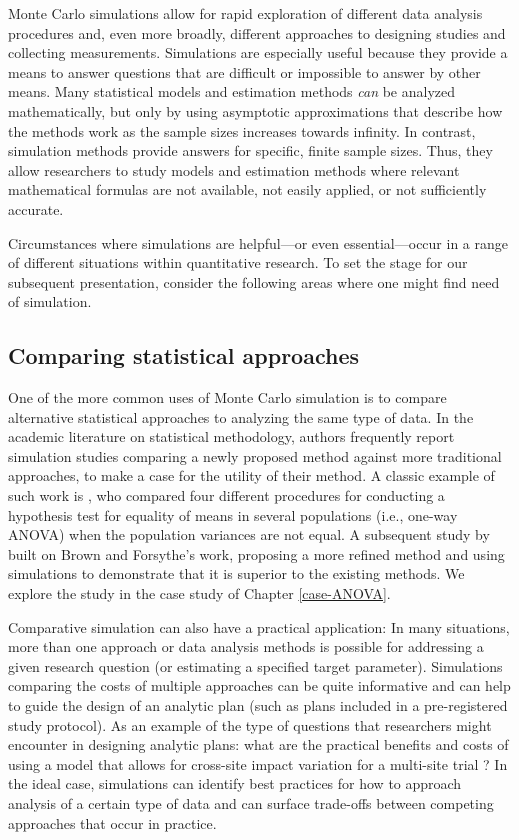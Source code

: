 \documentclass[
]{book}
\begin{document}
Monte Carlo simulations allow for rapid exploration of different data analysis procedures and, even more broadly, different approaches to designing studies and collecting measurements. Simulations are especially useful because they provide a means to answer questions that are difficult or impossible to answer by other means.
Many statistical models and estimation methods \emph{can} be analyzed mathematically, but only by using asymptotic approximations that describe how the methods work as the sample sizes increases towards infinity.
In contrast, simulation methods provide answers for specific, finite sample sizes.
Thus, they allow researchers to study models and estimation methods where relevant mathematical formulas are not available, not easily applied, or not sufficiently accurate.

Circumstances where simulations are helpful---or even essential---occur in a range of different situations within quantitative research.
To set the stage for our subsequent presentation, consider the following areas where one might find need of simulation.

\subsection{Comparing statistical approaches}\label{comparing-statistical-approaches}

One of the more common uses of Monte Carlo simulation is to compare alternative statistical approaches to analyzing the same type of data.
In the academic literature on statistical methodology, authors frequently report simulation studies comparing a newly proposed method against more traditional approaches, to make a case for the utility of their method.
A classic example of such work is \citet{brown1974SmallSampleBehavior}, who compared four different procedures for conducting a hypothesis test for equality of means in several populations (i.e., one-way ANOVA) when the population variances are not equal.
A subsequent study by \citet{mehrotra1997ImprovingBrownforsytheSolution} built on Brown and Forsythe's work, proposing a more refined method and using simulations to demonstrate that it is superior to the existing methods.
We explore the \citet{brown1974SmallSampleBehavior} study in the case study of Chapter \ref{case-ANOVA}.

Comparative simulation can also have a practical application: In many situations, more than one approach or data analysis methods is possible for addressing a given research question (or estimating a specified target parameter).
Simulations comparing the costs of multiple approaches can be quite informative and can help to guide the design of an analytic plan (such as plans included in a pre-registered study protocol).
As an example of the type of questions that researchers might encounter in designing analytic plans: what are the practical benefits and costs of using a model that allows for cross-site impact variation for a multi-site trial \citep{miratrix2021applied}?
In the ideal case, simulations can identify best practices for how to approach analysis of a certain type of data and can surface trade-offs between competing approaches that occur in practice.
\end{document}
